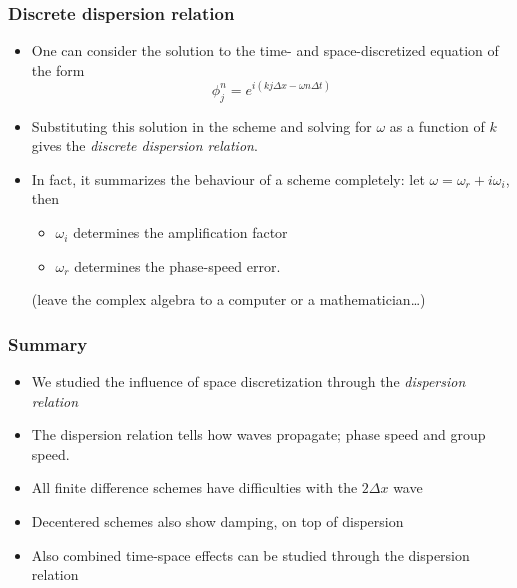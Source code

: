 \documentclass[aspectratio=43,9pt]{beamer}
\begin{document}
%
%
\begin{frame}
	\frametitle{Discrete dispersion relation}
	\vfill\begin{itemize}
		\item One can consider the solution to the time- and space-discretized equation of the form
			\begin{equation*}
				\phi_j^n = e^{i \left( k j \Delta x - \omega n \Delta t \right)}
			\end{equation*}
		\item Substituting this solution in the scheme and solving for $\omega$ as a function of $k$ gives the \emph{discrete dispersion relation}.\vfill
		\item In fact, it summarizes the behaviour of a scheme completely: let $\omega = \omega_r + i \omega_i$, then\vfill
			\begin{itemize}
				\item $\omega_i$ determines the amplification factor\vfill
				\item $\omega_r$ determines the phase-speed error.\vfill
			\end{itemize}
			(leave the complex algebra to a computer or a mathematician\ldots)
	\end{itemize}\vfill
\end{frame}
%
%
\begin{frame}
	\frametitle{Summary}
	\vfill\begin{itemize}
		\item We studied the influence of space discretization through the \emph{dispersion relation}\vfill
		\item The dispersion relation tells how waves propagate; phase speed and group speed.\vfill
		\item All finite difference schemes have difficulties with the $2\Delta x$ wave\vfill
		\item Decentered schemes also show damping, on top of dispersion\vfill
		\item Also combined time-space effects can be studied through the dispersion relation
	\end{itemize}\vfill
\end{frame}
%
%
\end{document}
